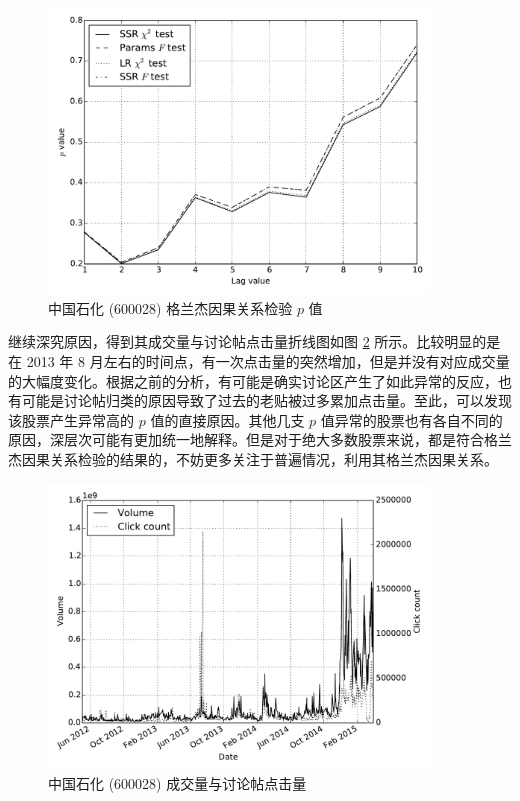 \begin{figure}
  \centering
  \includegraphics[width=0.9\textwidth]{plots/granger_causality_test_on_sse_50_abnormal_granger.pdf}
  \caption{中国石化 (600028) 格兰杰因果关系检验 $p$ 值}
  \label{granger_causality_test_on_sse_50_abnormal:1}
\end{figure}

继续深究原因，得到其成交量与讨论帖点击量折线图如图 \ref{granger_causality_test_on_sse_50_abnormal:2} 所示。比较明显的是在 2013 年 8 月左右的时间点，有一次点击量的突然增加，但是并没有对应成交量的大幅度变化。根据之前的分析，有可能是确实讨论区产生了如此异常的反应，也有可能是讨论帖归类的原因导致了过去的老贴被过多累加点击量。至此，可以发现该股票产生异常高的 $p$ 值的直接原因。其他几支 $p$ 值异常的股票也有各自不同的原因，深层次可能有更加统一地解释。但是对于绝大多数股票来说，都是符合格兰杰因果关系检验的结果的，不妨更多关注于普遍情况，利用其格兰杰因果关系。

\begin{figure}
  \centering
  \includegraphics[width=0.9\textwidth]{plots/granger_causality_test_on_sse_50_abnormal_plot.pdf}
  \caption{中国石化 (600028) 成交量与讨论帖点击量}
  \label{granger_causality_test_on_sse_50_abnormal:2}
\end{figure}


